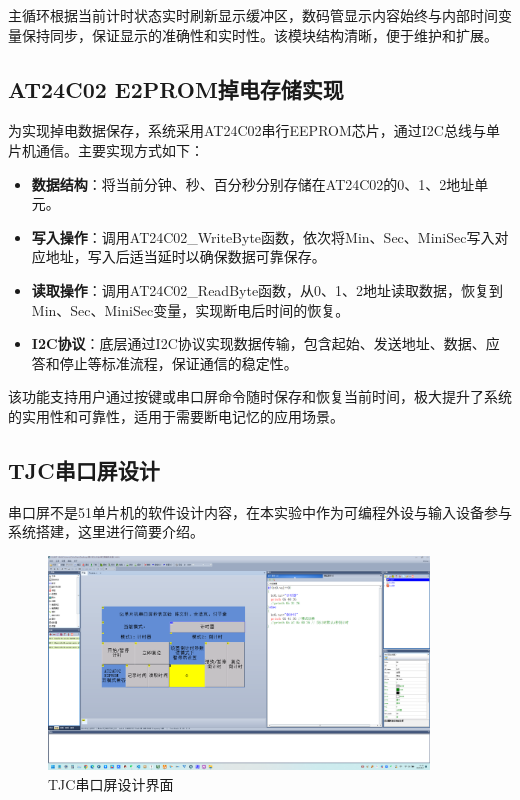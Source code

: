 \documentclass[12pt,hyperref,a4paper,UTF8]{ctexart}
\begin{document}
主循环根据当前计时状态实时刷新显示缓冲区，数码管显示内容始终与内部时间变量保持同步，保证显示的准确性和实时性。该模块结构清晰，便于维护和扩展。

\subsection{AT24C02 E2PROM掉电存储实现}

为实现掉电数据保存，系统采用AT24C02串行EEPROM芯片，通过I2C总线与单片机通信。主要实现方式如下：

\begin{itemize}
  \item \textbf{数据结构}：将当前分钟、秒、百分秒分别存储在AT24C02的0、1、2地址单元。
  \item \textbf{写入操作}：调用AT24C02\_WriteByte函数，依次将Min、Sec、MiniSec写入对应地址，写入后适当延时以确保数据可靠保存。
  \item \textbf{读取操作}：调用AT24C02\_ReadByte函数，从0、1、2地址读取数据，恢复到Min、Sec、MiniSec变量，实现断电后时间的恢复。
  \item \textbf{I2C协议}：底层通过I2C协议实现数据传输，包含起始、发送地址、数据、应答和停止等标准流程，保证通信的稳定性。
\end{itemize}

该功能支持用户通过按键或串口屏命令随时保存和恢复当前时间，极大提升了系统的实用性和可靠性，适用于需要断电记忆的应用场景。

\subsection{TJC串口屏设计}

串口屏不是51单片机的软件设计内容，在本实验中作为可编程外设与输入设备参与系统搭建，这里进行简要介绍。

\begin{figure}[H]
    \centering
    \includegraphics[width=0.9\textwidth]{figures/4.png} %
    \caption{TJC串口屏设计界面}
    \label{fig:hardware-connection}
\end{figure}
\end{document}
